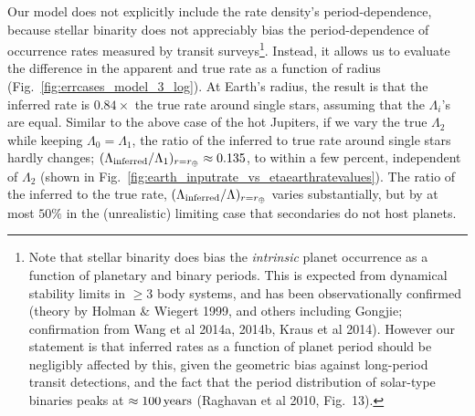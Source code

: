Our model does not explicitly include the rate density's period-dependence, 
because stellar binarity does not appreciably bias the period-dependence of 
occurrence rates measured by transit surveys\footnote{
    Note that stellar binarity does bias the {\it intrinsic} planet 
    occurrence as a function of planetary and binary periods. This is expected 
    from dynamical stability limits in $\geq$3 body systems, and has been 
    observationally confirmed (theory by Holman \& Wiegert 1999, and others 
    including Gongjie; confirmation from Wang et al 2014a, 2014b, Kraus et al 
    2014). 
    However our statement is that inferred rates as a function of planet     
    period should be negligibly affected by this, given the geometric bias 
    against long-period transit detections, and the fact that the period 
    distribution of solar-type binaries peaks at $\approx 100\,{\rm years}$ 
    (Raghavan et al 2010, Fig.~13).
}.
Instead, it allows us to evaluate the difference in the apparent and true rate 
as a function of radius 
(Fig.~\ref{fig:errcases_model_3_log}).
At Earth's radius, the result is that the inferred rate is $0.84\times$ the 
true rate around single stars, assuming that the $\Lambda_i$'s are equal.
Similar to the above case of the hot Jupiters, if we vary the true $\Lambda_2$ 
while keeping $\Lambda_0 = \Lambda_1$, the ratio of the inferred to true rate 
around single stars hardly 
changes; $(\Lambda_{\rm inferred}/\Lambda_1)_{r=r_\oplus} \approx 0.135$, to 
within a few percent, independent of $\Lambda_2$ (shown in 
Fig.~\ref{fig:earth_inputrate_vs_etaearthratevalues}).
The ratio of the inferred to the true rate, $(\Lambda_{\rm 
inferred}/\Lambda)_{r=r_\oplus}$ varies substantially, but by at most $50\%$ 
in the (unrealistic) limiting case that secondaries do not host planets.


